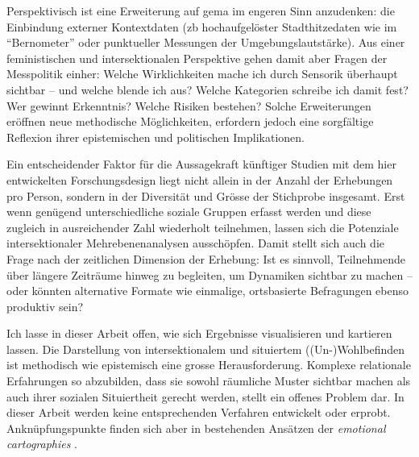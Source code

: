 Perspektivisch ist eine Erweiterung auf \gls{gema} im engeren Sinn anzudenken: die Einbindung externer Kontextdaten (\gls{zb} hochaufgelöster Stadthitzedaten wie im \enquote{Bernometer} \parencite[siehe][]{burgerModellingSpatialPattern2021} oder punktueller Messungen der Umgebungslautstärke). Aus einer feministischen und intersektionalen Perspektive gehen damit aber Fragen der Messpolitik einher: Welche Wirklichkeiten mache ich durch Sensorik überhaupt sichtbar -- und welche blende ich aus? Welche Kategorien schreibe ich damit fest? Wer gewinnt Erkenntnis? Welche Risiken bestehen? Solche Erweiterungen eröffnen neue methodische Möglichkeiten, erfordern jedoch eine sorgfältige Reflexion ihrer epistemischen und politischen Implikationen.

Ein entscheidender Faktor für die Aussagekraft künftiger Studien mit dem hier entwickelten Forschungsdesign liegt nicht allein in der Anzahl der Erhebungen pro Person, sondern in der Diversität und Grösse der Stichprobe insgesamt. Erst wenn genügend unterschiedliche soziale Gruppen erfasst werden und diese zugleich in ausreichender Zahl wiederholt teilnehmen, lassen sich die Potenziale intersektionaler Mehrebenenanalysen ausschöpfen. Damit stellt sich auch die Frage nach der zeitlichen Dimension der Erhebung: Ist es sinnvoll, Teilnehmende über längere Zeiträume hinweg zu begleiten, um Dynamiken sichtbar zu machen -- oder könnten alternative Formate wie einmalige, ortsbasierte Befragungen ebenso produktiv sein?

Ich lasse in dieser Arbeit offen, wie sich Ergebnisse visualisieren und kartieren lassen. Die Darstellung von intersektionalem und situiertem ((Un\nobreakdash-)Wohl\-be\-find\-en ist methodisch wie epistemisch eine grosse Herausforderung. Komplexe relationale Erfahrungen so abzubilden, dass sie sowohl räumliche Muster sichtbar machen als auch ihrer sozialen Situiertheit gerecht werden, stellt ein offenes Problem dar. In dieser Arbeit werden keine entsprechenden Verfahren entwickelt oder erprobt. Anknüpfungspunkte finden sich aber in bestehenden Ansätzen der \emph{emotional cartographies} \parencite[\gls{bspw}][]{bleischExploratoryGeovisualizationsSupporting2019}.

